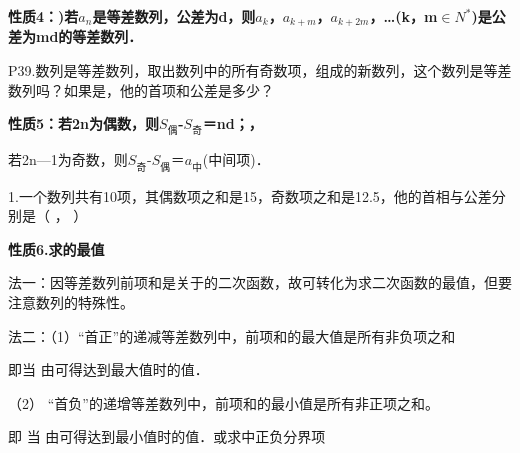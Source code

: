 \par\medskip\noindent\textbf{性质4：)若{\ensuremath{a_{n}}}是等差数列，公差为d，则\ensuremath{a_{k}}，\ensuremath{a_{k+m}}，\ensuremath{a_{k+2m}}，\ldots{}(k，m\ensuremath{\in}\ensuremath{N^{*}})是公差为md的等差数列．}\par
{}
\qquad{}P39.数列是等差数列，取出数列中的所有奇数项，组成的新数列，这个数列是等差数列吗？如果是，他的首项和公差是多少？\par
\par\medskip\noindent\textbf{性质5：若2n为偶数，则\ensuremath{S_{\text{偶}}}-\ensuremath{S_{\text{奇}}}＝nd；，}\par
\qquad{}若2n—1为奇数，则\ensuremath{S_{\text{奇}}}-\ensuremath{S_{\text{偶}}}＝\ensuremath{a_{\text{中}}}(中间项)．\par
{}
1.一个数列共有10项，其偶数项之和是15，奇数项之和是12.5，他的首相与公差分别是（  ，   ）\par
\par\medskip\noindent\textbf{性质6.求的最值}\par
{}\par
法一：因等差数列前项和是关于的二次函数，故可转化为求二次函数的最值，但要注意数列的特殊性。\par
法二：（1）“首正”的递减等差数列中，前项和的最大值是所有非负项之和\par
即当 由可得达到最大值时的值．\par
（2） “首负”的递增等差数列中，前项和的最小值是所有非正项之和。\par
即 当 由可得达到最小值时的值．或求中正负分界项\par

